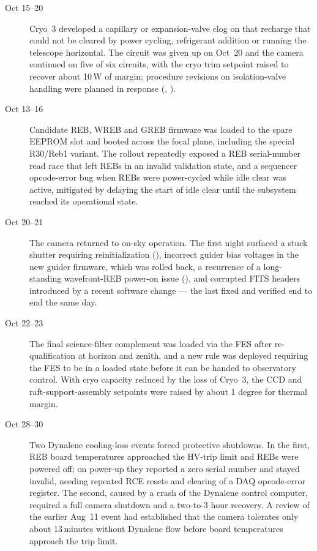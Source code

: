 \begin{description}
\item[Oct 15--20] Cryo~3 developed a capillary or expansion-valve clog
  on that recharge that could not be cleared by power cycling,
  refrigerant addition or running the telescope horizontal.  The
  circuit was given up on Oct~20 and the camera continued on five of
  six circuits, with the cryo trim setpoint raised to recover about
  10\,W of margin; procedure revisions on isolation-valve handling
  were planned in response (, ).

\item[Oct 13--16] Candidate REB, WREB and GREB firmware was loaded to
  the spare EEPROM slot and booted across the focal plane, including
  the special R30/Reb1 variant.  The rollout repeatedly exposed a REB
  serial-number read race that left REBs in an invalid validation
  state, and a sequencer opcode-error bug when REBs were power-cycled
  while idle clear was active, mitigated by delaying the start of idle
  clear until the subsystem reached its operational state.

\item[Oct 20--21] The camera returned to on-sky operation.  The first
  night surfaced a stuck shutter requiring reinitialization
  (), incorrect guider bias voltages in the new guider
  firmware, which was rolled back, a recurrence of a long-standing
  wavefront-REB power-on issue (), and corrupted FITS
  headers introduced by a recent software change --- the last fixed and
  verified end to end the same day.

\item[Oct 22--23] The final science-filter complement was loaded via
  the FES after re-qualification at horizon and zenith, and a new rule
  was deployed requiring the FES to be in a loaded state before it can
  be handed to observatory control.  With cryo capacity reduced by the
  loss of Cryo~3, the CCD and raft-support-assembly setpoints were
  raised by about 1 degree for thermal margin.

\item[Oct 28--30] Two Dynalene cooling-loss events forced protective
  shutdowns.  In the first, REB board temperatures approached the
  HV-trip limit and REBs were powered off; on power-up they reported a
  zero serial number and stayed invalid, needing repeated RCE resets
  and clearing of a DAQ opcode-error register.  The second, caused by a
  crash of the Dynalene control computer, required a full camera
  shutdown and a two-to-3 hour recovery.  A review of the earlier
  Aug~11 event had established that the camera tolerates only about
  13\,minutes without Dynalene flow before board temperatures approach
  the trip limit.
\end{description}

